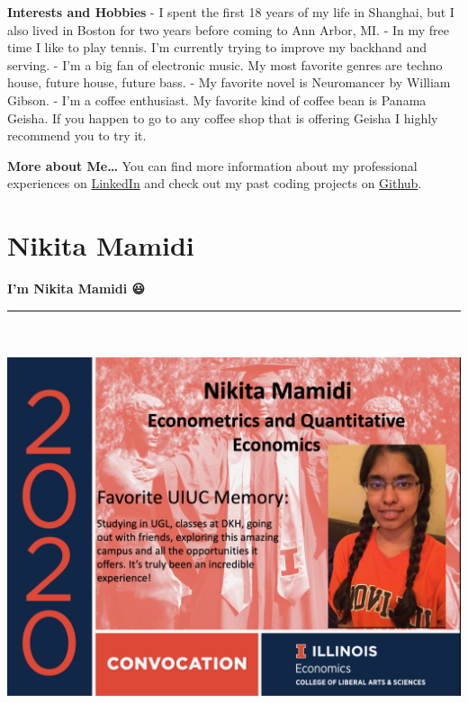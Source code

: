 \documentclass[
]{book}
\theoremstyle{definition}
\theoremstyle{definition}
\theoremstyle{definition}
\theoremstyle{definition}
\theoremstyle{remark}
\begin{document}
\textbf{Interests and Hobbies}
- I spent the first 18 years of my life in Shanghai, but I also lived in Boston for two years before coming to Ann Arbor, MI.
- In my free time I like to play tennis. I'm currently trying to improve my backhand and serving.
- I'm a big fan of electronic music. My most favorite genres are techno house, future house, future bass.
- My favorite novel is Neuromancer by William Gibson.
- I'm a coffee enthusiast. My favorite kind of coffee bean is Panama Geisha. If you happen to go to any coffee shop that is offering Geisha I highly recommend you to try it.

\textbf{More about Me\ldots{}}
You can find more information about my professional experiences on \href{https://www.linkedin.com/in/ycg2022/}{LinkedIn} and check out my past coding projects on \href{https://github.com/Yuchen-G}{Github}.

\hypertarget{nikita-mamidi}{%
\section{Nikita Mamidi}\label{nikita-mamidi}}

\textbf{I'm Nikita Mamidi 😃}

\begin{center}\rule{0.5\linewidth}{0.5pt}\end{center}

\includegraphics[width=9.375in,height=4.6875in]{nikita1.png}
\end{document}
